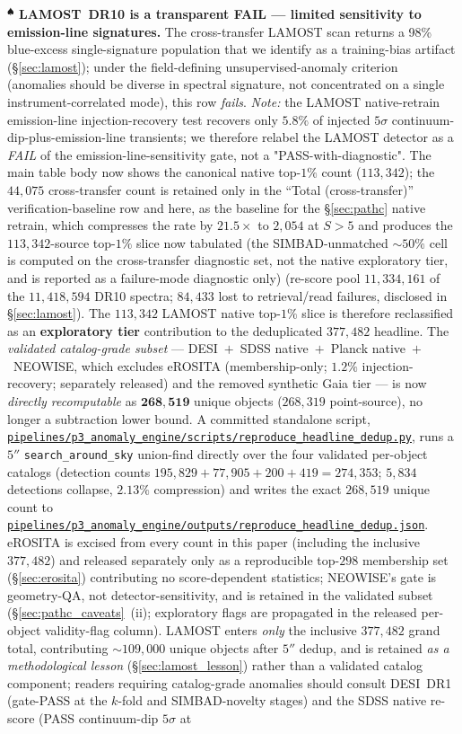 \documentclass[aps,prd,twocolumn,superscriptaddress,showpacs,preprintnumbers,nofootinbib,longbibliography,floatfix]{revtex4-2}
\newcommand{\repoBase}{https://github.com/Hubify-Projects/bigbounce/blob/main}
\newcommand{\artifact}[1]{\href{\repoBase/#1}{\nolinkurl{#1}}}
\begin{document}
{$^{\spadesuit}$ \textbf{LAMOST~DR10 is a transparent FAIL --- limited sensitivity to emission-line signatures.} The cross-transfer LAMOST scan returns a 98\% blue-excess single-signature population that we identify as a training-bias artifact (\S\ref{sec:lamost}); under the field-defining unsupervised-anomaly criterion (anomalies should be diverse in spectral signature, not concentrated on a single instrument-correlated mode), this row \emph{fails}. \textit{Note:} the LAMOST native-retrain emission-line injection-recovery test recovers only $5.8\%$ of injected $5\sigma$ continuum-dip-plus-emission-line transients; we therefore relabel the LAMOST detector as a \emph{FAIL} of the emission-line-sensitivity gate, not a "PASS-with-diagnostic". The main table body now shows the canonical native top-$1\%$ count ($113{,}342$); the $44{,}075$ cross-transfer count is retained only in the ``Total (cross-transfer)'' verification-baseline row and here, as the baseline for the \S\ref{sec:pathc} native retrain, which compresses the rate by $21.5\times$ to $2{,}054$ at $S>5$ and produces the $113{,}342$-source top-$1\%$ slice now tabulated (the SIMBAD-unmatched ${\sim}50\%$ cell is computed on the cross-transfer diagnostic set, not the native exploratory tier, and is reported as a failure-mode diagnostic only) (re-score pool $11{,}334{,}161$ of the $11{,}418{,}594$ DR10 spectra; $84{,}433$ lost to retrieval/read failures, disclosed in \S\ref{sec:lamost}). The $113{,}342$ LAMOST native top-$1\%$ slice is therefore reclassified as an \textbf{exploratory tier} contribution to the deduplicated $377{,}482$ headline. The \emph{validated catalog-grade subset} --- DESI~$+$~SDSS native~$+$~Planck native~$+$~NEOWISE, which excludes eROSITA (membership-only; $1.2\%$ injection-recovery; separately released) and the removed synthetic Gaia tier --- is now \emph{directly recomputable} as $\mathbf{268{,}519}$ unique objects ($268{,}319$ point-source), no longer a subtraction lower bound. A committed standalone script, \artifact{pipelines/p3\_anomaly\_engine/scripts/reproduce\_headline\_dedup.py}, runs a $5''$ \texttt{search\_around\_sky} union-find directly over the four validated per-object catalogs (detection counts $195{,}829 + 77{,}905 + 200 + 419 = 274{,}353$; $5{,}834$ detections collapse, $2.13\%$ compression) and writes the exact $268{,}519$ unique count to \artifact{pipelines/p3\_anomaly\_engine/outputs/reproduce\_headline\_dedup.json}. eROSITA is excised from every count in this paper (including the inclusive $377{,}482$) and released separately only as a reproducible top-$298$ membership set (\S\ref{sec:erosita}) contributing no score-dependent statistics; NEOWISE's gate is geometry-QA, not detector-sensitivity, and is retained in the validated subset (\S\ref{sec:pathc_caveats}~(ii); exploratory flags are propagated in the released per-object validity-flag column). LAMOST enters \emph{only} the inclusive $377{,}482$ grand total, contributing $\sim\!109{,}000$ unique objects after $5''$ dedup, and is retained \emph{as a methodological lesson} (\S\ref{sec:lamost_lesson}) rather than a validated catalog component; readers requiring catalog-grade anomalies should consult DESI~DR1 (gate-PASS at the $k$-fold and SIMBAD-novelty stages) and the SDSS native re-score (PASS continuum-dip $5\sigma$ at }
\end{document}

